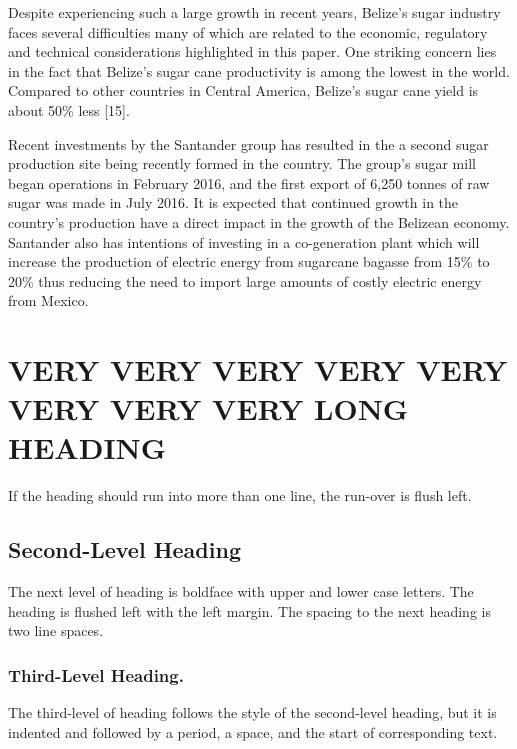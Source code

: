 \documentclass[twocolumn,10pt]{asme2e}
\begin{document}
Despite experiencing such a large growth in recent years, Belize's sugar industry faces several difficulties many of which are related to the economic, regulatory and technical considerations highlighted in this paper. One striking concern lies in the fact that Belize's sugar cane productivity is among the lowest in the world. Compared to other countries in Central America, Belize's sugar cane yield is about 50\% less [15]. 


Recent investments by the Santander group has resulted in the a second sugar production site being recently formed in the country. The group's sugar mill began operations in February 2016, and the first export of 6,250 tonnes of raw sugar was made in July 2016. It is expected that continued growth in the country's production have a direct impact in the growth of the Belizean economy. Santander also has intentions of investing in a co-generation plant which will increase the production of electric energy from sugarcane bagasse from 15\% to 20\% thus reducing the need to import large amounts of costly electric energy from Mexico.  



\section*{VERY VERY VERY VERY VERY VERY VERY VERY LONG HEADING}

If the heading should run into more than one line, the run-over is flush left.

\subsection*{Second-Level Heading}

The next level of heading is boldface with upper and lower case letters. The heading is flushed left with the left margin. The spacing to the next heading is two line spaces.

\subsubsection*{Third-Level Heading.}

The third-level of heading follows the style of the second-level heading, but it is indented and followed by a period, a space, and the start of corresponding text.
\end{document}
